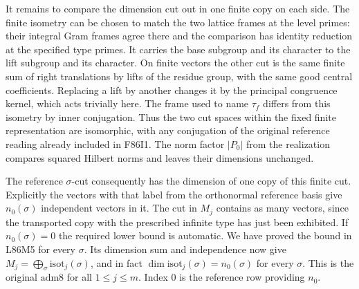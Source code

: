 It remains to compare the dimension cut out in one finite copy
on each side. The finite isometry can be chosen to match the two
lattice frames at the level primes: their integral Gram frames
agree there and the comparison has identity reduction at the
specified type primes. It carries the base subgroup and its
character to the lift subgroup and its character. On finite
vectors the other cut is the same finite sum of right translations
by lifts of the residue group, with the same good central
coefficients. Replacing a lift by another changes it by the
principal congruence kernel, which acts trivially here. The
frame used to name $\tau_f$ differs from this isometry by inner
conjugation. Thus the two cut spaces within the fixed finite
representation are isomorphic, with any conjugation of the
original reference reading already included in F86I1. The norm
factor $|P_0|$ from the realization compares squared Hilbert
norms and leaves their dimensions unchanged.

The reference $\sigma$-cut consequently has the dimension of
one copy of this finite cut. Explicitly the vectors with that
label from the orthonormal reference basis give $n_0(\sigma)$
independent vectors in it. The cut in $M_j$ contains as many
vectors, since the transported copy with the prescribed infinite
type has just been exhibited. If $n_0(\sigma)=0$ the required
lower bound is automatic. We have proved the bound in L86M5 for
every $\sigma$. Its dimension sum and independence now give
$\displaystyle M_j=\bigoplus_\sigma\mathrm{isot}_j(\sigma)$,
and in fact $\dim\mathrm{isot}_j(\sigma)=n_0(\sigma)$ for every
$\sigma$. This is the original $\mathrm{adm8}$ for all
$1\le j\le m$. Index $0$ is the reference row providing $n_0$.
